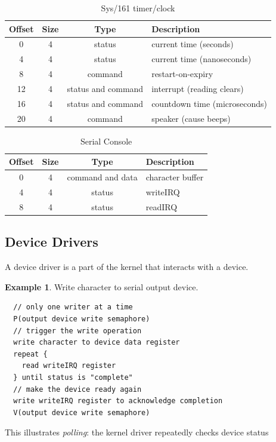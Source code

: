 \documentclass[12pt]{article}
\theoremstyle{plain}
\theoremstyle{definition}
\newtheorem*{ex*}{Example}
\begin{document}
\begin{table}[H]
  \vspace{-20pt}
  \caption{Sys/161 timer/clock}
  \label{tab:sys161_timer}
  \centering

  \begin{tabular}{|c|c|c|l|}
  \hline
  Offset & Size & Type & Description \\ \hline \hline
  0 & 4 & status & current time (seconds) \\ \hline
  4 & 4 & status & current time (nanoseconds) \\ \hline
  8 & 4 & command & restart-on-expiry \\ \hline
  12 & 4 & status and command & interrupt (reading clears) \\ \hline
  16 & 4 & status and command & countdown time (microseconds) \\ \hline
  20 & 4 & command & speaker (cause beeps) \\ \hline
  \end{tabular}
\end{table}

\begin{table}[H]
  \vspace{-20pt}
  \caption{Serial Console}
  \label{tab:serial_con}
  \centering

  \begin{tabular}{|c|c|c|l|}
  \hline
  Offset & Size & Type & Description \\ \hline \hline
  0 & 4 & command and data & character buffer \\ \hline
  4 & 4 & status & writeIRQ \\ \hline
  8 & 4 & status & readIRQ \\ \hline
  \end{tabular}
\end{table}

\subsection{Device Drivers}
A device driver is a part of the kernel that interacts with a device.

\begin{ex*}
Write character to serial output device.
\begin{verbatim}
  // only one writer at a time
  P(output device write semaphore)
  // trigger the write operation
  write character to device data register
  repeat {
    read writeIRQ register
  } until status is "complete"
  // make the device ready again
  write writeIRQ register to acknowledge completion
  V(output device write semaphore)
\end{verbatim}
This illustrates \emph{polling}: the kernel driver repeatedly checks device status
\end{ex*}
\end{document}
